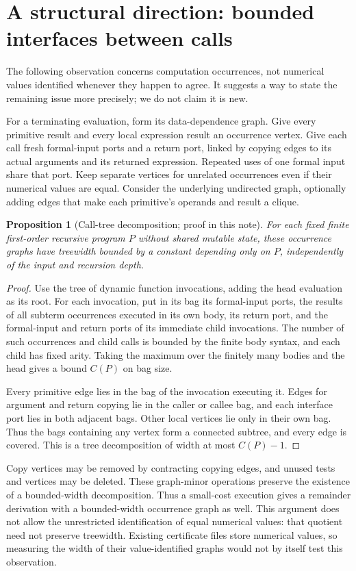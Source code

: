 \documentclass[11pt]{article}
\newtheorem{proposition}{Proposition}
\begin{document}
\section{A structural direction: bounded interfaces between calls}

The following observation concerns computation occurrences, not numerical
values identified whenever they happen to agree. It suggests a way to state
the remaining issue more precisely; we do not claim it is new.

For a terminating evaluation, form its data-dependence graph. Give every
primitive result and every local expression result an occurrence vertex.
Give each call fresh formal-input ports and a return port, linked by copying
edges to its actual arguments and its returned expression. Repeated uses of
one formal input share that port. Keep separate vertices for unrelated
occurrences even if their numerical values are equal. Consider the underlying
undirected graph, optionally adding edges that make each primitive's operands
and result a clique.

\begin{proposition}[Call-tree decomposition; proof in this note]
For each fixed finite first-order recursive program $P$ without shared mutable
state, these occurrence graphs have treewidth bounded by a constant depending
only on $P$, independently of the input and recursion depth.
\end{proposition}
\begin{proof}
Use the tree of dynamic function invocations, adding the head evaluation as
its root. For each invocation, put in its bag its formal-input ports, the
results of all subterm occurrences executed in its own body, its return port,
and the formal-input and return ports of its immediate child invocations.
The number of such occurrences and child calls is bounded by the finite body
syntax, and each child has fixed arity. Taking the maximum over the finitely
many bodies and the head gives a bound $C(P)$ on bag size.

Every primitive edge lies in the bag of the invocation executing it. Edges
for argument and return copying lie in the caller or callee bag, and each
interface port lies in both adjacent bags. Other local vertices lie only in
their own bag. Thus the bags containing any vertex form a connected subtree,
and every edge is covered. This is a tree decomposition of width at most
$C(P)-1$.
\end{proof}

Copy vertices may be removed by contracting copying edges, and unused tests
and vertices may be deleted. These graph-minor operations preserve the
existence of a bounded-width decomposition. Thus a small-cost execution gives
a remainder derivation with a bounded-width occurrence graph as well.
This argument does not allow the unrestricted identification of equal
numerical values: that quotient need not preserve treewidth. Existing
certificate files store numerical values, so measuring the width of their
value-identified graphs would not by itself test this observation.
\end{document}
